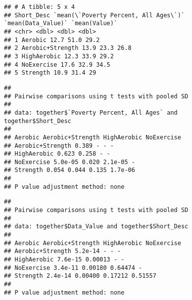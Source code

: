 \documentclass[]{article}
\newenvironment{Shaded}{\begin{snugshade}}{\end{snugshade}}
\newcommand{\DataTypeTok}[1]{\textcolor[rgb]{0.13,0.29,0.53}{#1}}
\newcommand{\KeywordTok}[1]{\textcolor[rgb]{0.13,0.29,0.53}{\textbf{#1}}}
\newcommand{\NormalTok}[1]{#1}
\newcommand{\OperatorTok}[1]{\textcolor[rgb]{0.81,0.36,0.00}{\textbf{#1}}}
\newcommand{\StringTok}[1]{\textcolor[rgb]{0.31,0.60,0.02}{#1}}
\begin{document}
\begin{verbatim}
## # A tibble: 5 x 4
## Short_Desc `mean(\`Poverty Percent, All Ages\`)`
`mean(Data_Value)` `mean(Value)`
## <chr> <dbl> <dbl> <dbl>
## 1 Aerobic 12.7 51.0 29.2
## 2 Aerobic+Strength 13.9 23.3 26.8
## 3 HighAerobic 12.3 33.9 29.2
## 4 NoExercise 17.6 32.9 34.5
## 5 Strength 10.9 31.4 29
\end{verbatim}

\begin{Shaded}
\end{Shaded}

\begin{verbatim}
##
## Pairwise comparisons using t tests with pooled SD
##
## data: together$`Poverty Percent, All Ages` and
together$Short_Desc
##
## Aerobic Aerobic+Strength HighAerobic NoExercise
## Aerobic+Strength 0.389 - - -
## HighAerobic 0.623 0.258 - -
## NoExercise 5.0e-05 0.020 2.1e-05 -
## Strength 0.054 0.044 0.135 1.7e-06
##
## P value adjustment method: none
\end{verbatim}

\begin{Shaded}
\end{Shaded}

\begin{verbatim}
##
## Pairwise comparisons using t tests with pooled SD
##
## data: together$Data_Value and together$Short_Desc
##
## Aerobic Aerobic+Strength HighAerobic NoExercise
## Aerobic+Strength 5.2e-14 - - -
## HighAerobic 7.6e-15 0.00013 - -
## NoExercise 3.4e-11 0.00180 0.64474 -
## Strength 2.4e-14 0.00400 0.17212 0.51557
##
## P value adjustment method: none
\end{verbatim}

\begin{Shaded}
\end{Shaded}
\end{document}
